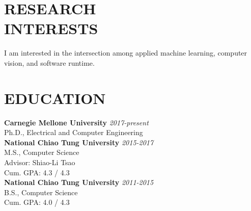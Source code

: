 \documentclass[margin, 9pt]{res} %
\begin{document}
\begin{resume}


\vspace*{-5pt}
\section{RESEARCH\\ INTERESTS}

I am interested in the intersection among applied machine learning, computer
vision, and software runtime.



\section{EDUCATION}

\textbf{Carnegie Mellone University} \hfill\textit{2017-present}\\
Ph.D., Electrical and Computer Engineering\\

\textbf{National Chiao Tung University} \hfill\textit{2015-2017}\\
M.S., Computer Science\\
Advisor: Shiao-Li Tsao\\
Cum. GPA: 4.3 / 4.3\\

\vspace*{-5pt}
\textbf{National Chiao Tung University} \hfill\textit{2011-2015}\\
B.S., Computer Science\\
Cum. GPA: 4.0 / 4.3\\



\end{resume}
\end{document}
